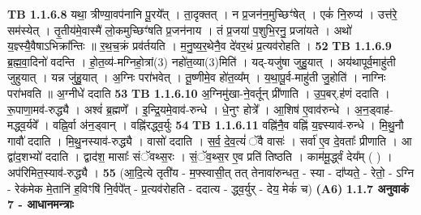 \documentclass[17pt]{extarticle}
\begin{document}
                  \newline
                                \textbf{ TB 1.1.6.8} \newline
                  यथा॒ त्रीण्या॒वप॑नानि पू॒रये᳚त् । ता॒दृक्तत् । न प्र॒जन॑न॒मुच्छिꣳ॑षेत् । एकं॑ नि॒रुप्य॑ । उत्त॑रे॒ सम॑स्येत् । तृ॒तीय॑मे॒वास्मै॑ लो॒कमुच्छिꣳ॑षति प्र॒जन॑नाय । तं प्र॒जया॑ प॒शुभि॒रनु॒ प्रजा॑यते । अथो॑ य॒ज्ञ्स्यै॒वैषाऽभिक्रा᳚न्तिः ॥ र॒थ॒च॒क्रं प्रव॑र्तयति । म॒नु॒ष्य॒र॒थेनै॒व दे॑वर॒थं प्र॒त्यव॑रोहति । \textbf{ 52} \newline
                  \newline
                                \textbf{ TB 1.1.6.9} \newline
                  ब्र॒ह्म॒वा॒दिनो॑ वदन्ति । हो॒त॒व्य॑-मग्निहो॒त्रां(3) नहो॑त॒व्या(3)मिति॑ । यद्-यजु॑षा जुहु॒यात् । अय॑थापूर्व॒माहु॑ती जुहुयात् । यन्न जु॑हु॒यात् । अ॒ग्निः परा॑भवेत् । तू॒ष्णीमे॒व हो॑त॒व्य᳚म् । य॒था॒पू॒र्व-माहु॑ती जु॒होति॑ । नाग्निः परा॑भवति ॥ अ॒ग्नीधे॑ ददाति \textbf{ 53} \newline
                  \newline
                                \textbf{ TB 1.1.6.10} \newline
                  अ॒ग्निमु॑खा-ने॒वर्तून् प्री॑णाति । उ॒प॒बर्.ह॑णं ददाति । रू॒पाणा॒मव॑-रुद्ध्यै । अश्वं॑ ब्र॒ह्मणे᳚ । इ॒न्द्रि॒यमे॒वाव॑-रुन्धे । धे॒नुꣳ होत्रे᳚ । आ॒शिष॑ ए॒वाव॑रुन्धे । अ॒न॒ड्वाह॑-मद्ध्व॒र्यवे᳚ । वह्नि॒र्वा अ॑न॒ड्वान् । वह्नि॑रद्ध्व॒र्युः \textbf{ 54} \newline
                  \newline
                                \textbf{ TB 1.1.6.11} \newline
                  वह्नि॑नै॒व वह्नि॑ य॒ज्ञ्स्याव॑-रुन्धे । मि॒थु॒नौ गावौ॑ ददाति । मि॒थु॒नस्याव॑-रुद्ध्यै । वासो॑ ददाति । स॒र्व॒ दे॒व॒त्यं॑ ॅवै वासः॑ । सर्वा॑ ए॒व दे॒वताः᳚ प्रीणाति । आ द्वा॑द॒शभ्यो॑ ददाति । द्वाद॑श॒ मासाः᳚ संॅवथ्स॒रः । सं॒ॅव॒थ्स॒र ए॒व प्रति॑ तिष्ठति । काम॑मू॒र्द्ध्वं देय᳚म् ( ) । अप॑रिमित॒स्याव॑-रुद्ध्यै । \textbf{ 55} \newline
                  \newline
                                    (आ॒दि॒त्ये तृती॑य - म॒फ्स्वासी॒त् तत् तेनावा॑रुन्धत॒ - स्या - दा᳚प्यते॒ - रेतो॒ - ऽग्नि - रेक॑मेक मे॒तानि॑ ह॒विꣳषि॑ नि॒र्वपे᳚त् - प्र॒त्यव॑रोहति - ददात्य - द्ध्व॒र्युर् - देय॒ मेकं॑ च) \textbf{(A6)} \newline \newline
                \textbf{ 1.1.7     अनुवाकं   7 - आधानमन्त्राः} \newline
\end{document}
